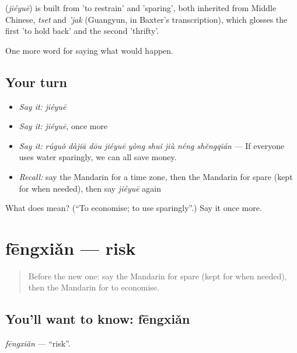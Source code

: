 \begin{cousinweb}
\textbf{} (\emph{jiéyuē}) is built from  'to restrain' and  'sparing', both inherited from Middle Chinese, \emph{tset} and \emph{'jak} (Guangyun, in Baxter's transcription), which glosses the first 'to hold back' and the second 'thrifty'.
\end{cousinweb}

\begin{grammarlens}[title={What you've built}]
One more word for saying what would happen.
\end{grammarlens}

\subsection*{Your turn}
\begin{itemize}
\raggedright
  \item \emph{Say it:} \emph{jiéyuē}
  \item \emph{Say it:} \emph{jiéyuē}, once more
  \item \emph{Say it:} \emph{rúguǒ dàjiā dōu jiéyuē yòng shuǐ jiù néng shěngqián} — If everyone uses water sparingly, we can all save money.
  \item \emph{Recall:} say the Mandarin for a time zone, then the Mandarin for spare (kept for when needed), then say \emph{jiéyuē} again
\end{itemize}

\begin{tcolorbox}[breakable,colback=teal!4,colframe=teal!35!black,title={Before you move on}]
What does  mean? (\textquotedblleft{}To economise; to use sparingly\textquotedblright{}.) Say it once more.
\end{tcolorbox}
\section[fēngxiǎn]{fēngxiǎn — risk}

\label{lesson:ZH-C389-fengxian}



\begin{quote}
Before the new one: say the Mandarin for spare (kept for when needed), then the Mandarin for to economise.
\end{quote}

\subsection*{You'll want to know: fēngxiǎn}
\emph{fēngxiǎn} — \textquotedblleft{}risk\textquotedblright{}.

